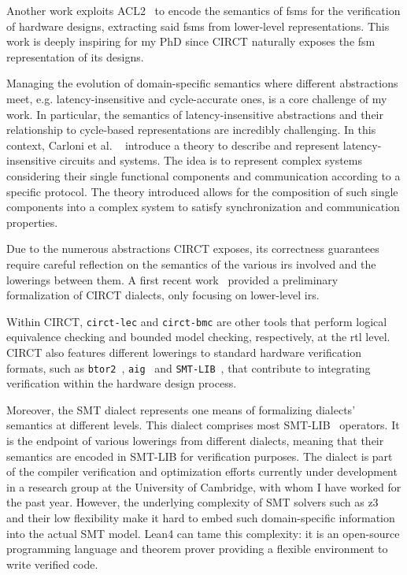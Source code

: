 \documentclass[sigconf,authorversion,nonacm, 11pt]{acmart}
\begin{document}
Another work exploits ACL2~\cite{hunt2006sat} to encode the semantics of \acp{fsm} for the verification of hardware designs, extracting said \acp{fsm} from lower-level representations.
This work is deeply inspiring for my PhD since CIRCT naturally exposes the \ac{fsm} representation of its designs.

Managing the evolution of domain-specific semantics where different abstractions meet, e.g. latency-insensitive and cycle-accurate ones, is a core challenge of my work.
In particular, the semantics of latency-insensitive abstractions and their relationship to cycle-based representations are incredibly challenging. 
In this context, Carloni et al. ~\cite{carloni2001theory} introduce a theory to describe and represent latency-insensitive circuits and systems. 
The idea is to represent complex systems considering their single functional components and communication according to a specific protocol. 
The theory introduced allows for the composition of such single components into a complex system to satisfy synchronization and communication properties. 

Due to the numerous abstractions CIRCT exposes, its correctness guarantees require careful reflection on the semantics of the various \acp{ir} involved and the lowerings between them. 
A first recent work~\cite{zhao2024k} provided a preliminary formalization of CIRCT dialects, only focusing on lower-level \acp{ir}. 

Within CIRCT, \texttt{circt-lec} and \texttt{circt-bmc} are other tools that perform logical equivalence checking and bounded model checking, respectively, at the \ac{rtl} level. 
CIRCT also features different lowerings to standard hardware verification formats, such as \texttt{btor2}~\cite{btor2, niemetz2018btor2}, \texttt{aig}~\cite{aiger2} and \texttt{SMT-LIB}~\cite{barrett2010smt}, that contribute to integrating verification within the hardware design process.

Moreover, the SMT dialect represents one means of formalizing dialects' semantics at different levels. 
This dialect comprises most SMT-LIB~\cite{barrett2010smt} operators. 
It is the endpoint of various lowerings from different dialects, meaning that their semantics are encoded in SMT-LIB for verification purposes.
The dialect is part of the compiler verification and optimization efforts currently under development in a research group at the University of Cambridge, with whom I have worked for the past year. 
However, the underlying complexity of SMT solvers such as z3~\cite{de2008z3} and their low flexibility make it hard to embed such domain-specific information into the actual SMT model. 
Lean4 can tame this complexity: it is an open-source programming language and theorem prover providing a flexible environment to write verified code. 
\end{document}
